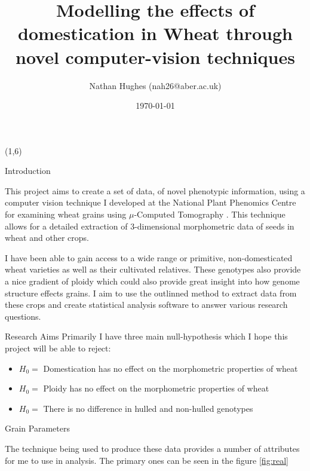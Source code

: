 \documentclass[final]{beamer}
\title{Modelling the effects of domestication in Wheat through novel computer-vision techniques}
\author{Nathan Hughes (nah26@aber.ac.uk)}
\date{\today}
\begin{document}
\begin{frame}{} 

  \begin{textblock}{27.7}(1,6)

    \begin{block}{Introduction}

      This project aims to create a set of data, of novel phenotypic information, using a computer vision technique I developed 
      at the National Plant Phenomics Centre for examining wheat grains using $\mu$-Computed Tomography \cite{Hughes2017}. This technique
      allows for a detailed extraction of 3-dimensional morphometric data of seeds in wheat and other crops.

      \vspace{1cm}
      
      I have been able to gain access to a wide range or primitive, non-domesticated wheat varieties
      as well as their cultivated relatives. These genotypes also provide a nice gradient of ploidy
      which could also provide great insight into how genome structure effects grains. I aim to use
      the outlinned method to extract data from these crops and create statistical analysis software
      to answer various research questions.
      
    \end{block}

    \begin{block}{Research Aims}
      Primarily I have three main null-hypothesis which I hope this project will be able to reject:

      \begin{itemize}
      \item{$H_0=$ Domestication has no effect on the morphometric properties of wheat}
      \item{$H_0=$ Ploidy has no effect on the morphometric properties of wheat}
      \item{$H_0=$ There is no difference in hulled and non-hulled genotypes}
      \end{itemize}
      
    \end{block}

    \begin{block}{Grain Parameters}

      The technique being used to produce these data provides a number of attributes for me to use in
      analysis. The primary ones can be seen in the figure \ref{fig:real}


\end{block}
\end{textblock}
\end{frame}
\end{document}
